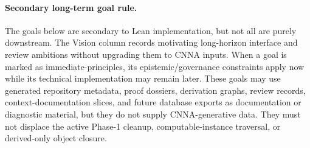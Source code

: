 \paragraph{Secondary long-term goal rule.} The goals below are secondary to Lean implementation, but not all are purely downstream. The Vision column records motivating long-horizon interface and review ambitions without upgrading them to CNNA inputs. When a goal is marked as immediate-principles, its epistemic/governance constraints apply now while its technical implementation may remain later. These goals may use generated repository metadata, proof dossiers, derivation graphs, review records, context-documentation slices, and future database exports as documentation or diagnostic material, but they do not supply CNNA-generative data. They must not displace the active Phase-1 cleanup, computable-instance traversal, or derived-only object closure.


